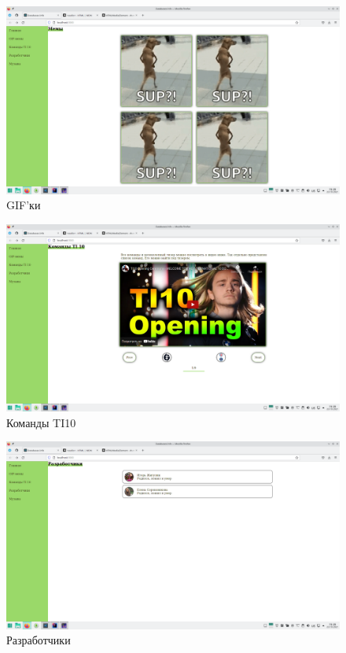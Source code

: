 \begin{figure}[H]
	\centering
	\includegraphics[width=\linewidth]{02}
	\caption{GIF'ки}
\end{figure}

\begin{figure}[H]
	\centering
	\includegraphics[width=\linewidth]{03}
	\caption{Команды TI10}
\end{figure}

\begin{figure}[H]
	\centering
	\includegraphics[width=\linewidth]{04}
	\caption{Разработчики}
\end{figure}

